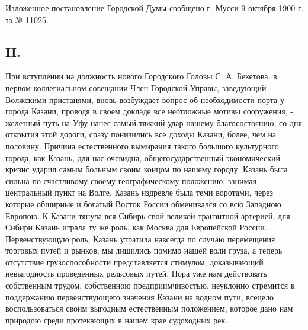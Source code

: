 \documentclass[oneside,final,14pt]{extreport}
\begin{document}
Изложенное постановление Городской Думы сообщено г. Мусси 9 октября 1900 г. за № 11025.

{%
	\centering
	\subsection*{II.}
}
При вступлении на должность нового Городского Головы С. А. Бекетова, в первом коллегиальном совещании Член Городской Управы, заведующий Волжскими пристанями, вновь возбуждает вопрос об необходимости порта у города Казани, проводя в своем докладе все неотложные мотивы сооружения, - железный путь на Уфу нанес самый тяжкий удар нашему благосостоянию, со дня открытия этой дороги, сразу понизились все доходы Казани, более, чем на половину. Причина естественного вымирания такого большого культурного города, как Казань, для нас очевидна, общегосударственный экономический кризис ударил самым больным своим концом по нашему городу. Казань была сильна по счастливому своему географическому положению. занимая центральный пункт на Волге. Казань издревле была теми воротами, через которые обширные и богатый Восток России обменивался со всю Западною Европою. К Казани тянула вся Сибирь свой великой транзитной артерией, для Сибири Казань играла ту же роль, как Москва для Европейской России. Первенствующую роль, Казань утратила навсегда по случаю перемещения торговых путей и рынков, мы лишились помимо нашей воли груза, а теперь отсутствие грузоспособности представляется стимулом, доказывающий невыгодность проведенных рельсовых путей. Пора уже нам действовать собственным трудом, собственною предприимчивостью, неуклонно стремится к поддержанию первенствующего значения Казани на водном пути, всецело воспользоваться своим выгодным естественным положением, которое дано нам природою среди протекающих в нашем крае судоходных рек.
\end{document}
